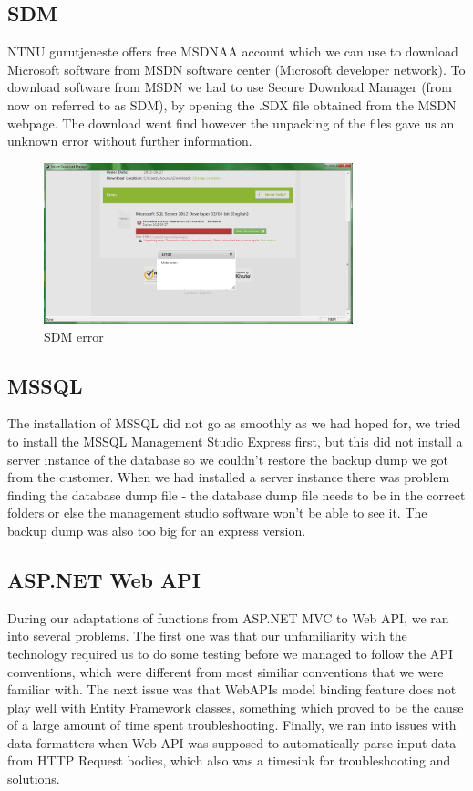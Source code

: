 \subsection{SDM}
NTNU gurutjeneste offers free MSDNAA account which we can use to download Microsoft software from MSDN software center (Microsoft developer network). To download software from MSDN we had to use Secure Download Manager (from now on referred to as SDM), by opening the .SDX file obtained from the MSDN webpage. The download went find however the unpacking of the files gave us an unknown error without further information.
\begin{figure}[H]
\centering
\includegraphics[width=0.8\textwidth]{images/issue00.png}
\caption{SDM error}
\label{fig:SDM_error}
\end{figure}

\subsection{MSSQL}
The installation of MSSQL did not go as smoothly as we had hoped for, we tried to install the MSSQL Management Studio Express first, but this did not install a server instance of the database so we couldn't restore the backup dump we got from the customer. When we had installed a server instance there was problem finding the database dump file - the database dump file needs to be in the correct folders or else the management studio software won't be able to see it. The backup dump was also too big for an express version.

\subsection{ASP.NET Web API}
\label{subsubsec:webapiissues}
During our adaptations of functions from ASP.NET MVC to Web API, we ran into several problems. The first one was that our unfamiliarity with the technology required us to do some testing before we managed to follow the API conventions, which were different from most similiar conventions that we were familiar with.
The next issue was that WebAPIs model binding feature does not play well with Entity Framework classes, something which proved to be the cause of a large amount of time spent troubleshooting.
Finally, we ran into issues with data formatters when Web API was supposed to automatically parse input data from HTTP Request bodies, which also was a timesink for troubleshooting and solutions.

